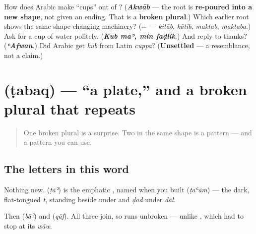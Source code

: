 \begin{tcolorbox}[breakable,colback=teal!4,colframe=teal!35!black,title={Before you move on}]
How does Arabic make \textquotedblleft{}cups\textquotedblright{} out of \textbf{}? (\emph{\textbf{Akwāb}} — the root is \textbf{re-poured into a new shape}, not given an ending. That is a \textbf{broken plural}.) Which earlier root shows the same shape-changing machinery? (\textbf{--} — \emph{kitāb}, \emph{kātib}, \emph{maktab}, \emph{maktaba}.) Ask for a cup of water politely. (\emph{\textbf{Kūb māʾ, min faḍlik}}.) And reply to thanks? (\emph{\textbf{ʿAfwan}}.) Did Arabic get \emph{kūb} from Latin \emph{cuppa}? (\textbf{Unsettled} — a resemblance, not a claim.)
\end{tcolorbox}
\section[\texorpdfstring{\ar{طبق} (ṭabaq)}{طبق (ṭabaq)}]{ (ṭabaq) — \textquotedblleft{}a plate,\textquotedblright{} and a broken plural that repeats}

\label{lesson:AR-C36-tabaq}



\begin{quote}
One broken plural is a surprise. Two in the same shape is a pattern — and a pattern you can use.
\end{quote}

\subsection*{The letters in this word}
Nothing new. \textbf{} (\emph{ṭāʾ}) is the emphatic \textbf{}, named when you built \textbf{} (\emph{ṭaʿām}) — the dark, flat-tongued \emph{t}, standing beside \textbf{} under \textbf{} and \emph{ḍād} under \emph{dāl}.

Then \textbf{} (\emph{bāʾ}) and \textbf{} (\emph{qāf}). All three join, so \textbf{} runs unbroken — unlike \textbf{}, which had to stop at its \emph{wāw}.

